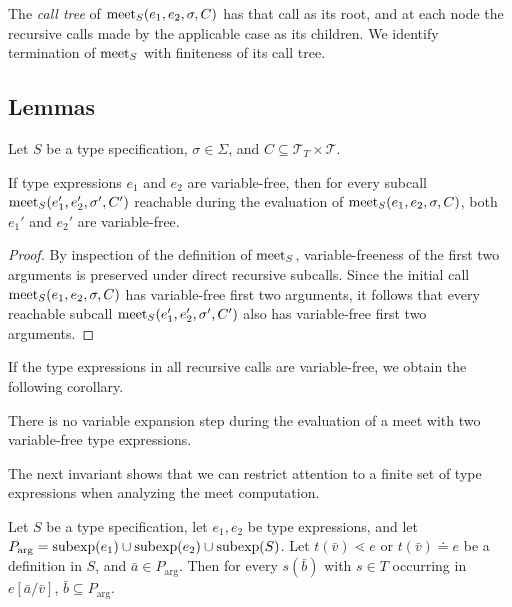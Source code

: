 \documentclass[doc]{subfiles}
\begin{document}
The \emph{call tree} of $\mathrm{meet}_S(e_1, e_2, \sigma, C)$ has that call as its root,
and at each node the recursive calls made by the applicable case as its children.
We identify termination of $\mathrm{meet}_S$ with finiteness of its call tree.

\subsection*{Lemmas}

\begin{lemma}\label{lem:vfree-inv}
	Let $S$ be a type specification,
	$\sigma \in \Sigma$,
	and $C \subseteq \mathcal{T}_T \times \mathcal{T}$.

	If type expressions $e_1$ and $e_2$ are variable-free,
	then for every subcall $\mathrm{meet}_S(e_1',e_2',\sigma',C')$
	reachable during the evaluation of $\mathrm{meet}_S(e_1,e_2,\sigma,C)$,
	both $e_1'$ and $e_2'$ are variable-free.
\end{lemma}

\begin{proof}
	By inspection of the definition of $\mathrm{meet}_S$,
	variable-freeness of the first two arguments is preserved under direct recursive subcalls.
	Since the initial call $\mathrm{meet}_S(e_1,e_2,\sigma,C)$ has variable-free
	first two arguments, it follows that every reachable subcall
	$\mathrm{meet}_S(e_1',e_2',\sigma',C')$ also has variable-free first two
	arguments.
\end{proof}

If the type expressions in all recursive calls are variable-free,
we obtain the following corollary.

\begin{corollary}\label{cor:novarexp}
	There is no variable expansion step during the evaluation of a meet with
	two variable-free type expressions.
\end{corollary}

The next invariant shows that we can restrict attention to a finite set of type
expressions when analyzing the meet computation.

\begin{lemma}\label{lem:closure}
	Let $S$ be a type specification, let $e_1, e_2$ be type expressions, and let
	$P_{\mathrm{arg}} = \mathrm{subexp}(e_1) \cup \mathrm{subexp}(e_2) \cup \mathrm{subexp}(S)$.
	Let $t(\bar v) \lessdot e$ or $t(\bar v) \doteq e$ be a definition in $S$, and $\bar a \in P_{\mathrm{arg}}$.
	Then for every $s(\bar b)$ with $s \in T$ occurring in $e[\bar a/\bar v]$, $\bar b \subseteq P_{\mathrm{arg}}$.
\end{lemma}
\end{document}
